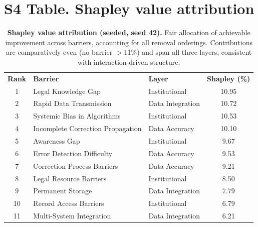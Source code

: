 \documentclass[10pt,letterpaper]{article}
\newlength\savedwidth
\newcommand\thickhline{\noalign{\global\savedwidth\arrayrulewidth\global\arrayrulewidth 2pt}\hline\noalign{\global\arrayrulewidth\savedwidth}}
\begin{document}
\section*{S4 Table. Shapley value attribution}
\begin{table}[!ht]\centering
\caption{{\bf Shapley value attribution (seeded, seed 42).} Fair allocation of achievable improvement across barriers, accounting for all removal orderings. Contributions are comparatively even (no barrier $>$11\%) and span all three layers, consistent with interaction-driven structure.}
\label{S4}
\begin{tabular}{c l l c}
\hline \textbf{Rank} & \textbf{Barrier} & \textbf{Layer} & \textbf{Shapley (\%)} \\ \thickhline
1 & Legal Knowledge Gap & Institutional & 10.95 \\
2 & Rapid Data Transmission & Data Integration & 10.72 \\
3 & Systemic Bias in Algorithms & Institutional & 10.53 \\
4 & Incomplete Correction Propagation & Data Accuracy & 10.10 \\
5 & Awareness Gap & Institutional & 9.67 \\
6 & Error Detection Difficulty & Data Accuracy & 9.53 \\
7 & Correction Process Barriers & Data Accuracy & 9.21 \\
8 & Legal Resource Barriers & Institutional & 8.50 \\
9 & Permanent Storage & Data Integration & 7.79 \\
10 & Record Access Barriers & Institutional & 6.79 \\
11 & Multi-System Integration & Data Integration & 6.21 \\ \hline
\end{tabular}
\end{table}

\end{document}
